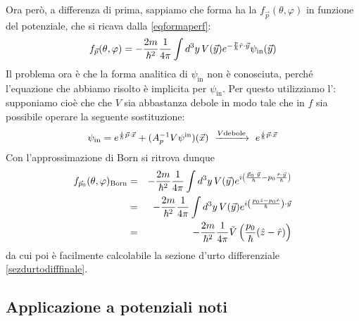 \documentclass[../../FisicaTeorica.tex]{subfiles}
\begin{document}
Ora per{\`o}, a differenza di prima, sappiamo che forma ha la $f_{\vec p}
(\theta, \varphi)$ in funzione del potenziale, che si ricava dalla \eqref{eqformaperf}:
\[ f_{\vec p} (\theta, \varphi) = - \frac{2 m}{\hbar^2}  \frac{1}{4 \pi}  \int
   d^3 y \hspace{0.17em} V (\vec{y}) e^{- \frac{p}{\hbar}  \hat{r} \cdot
   \vec{y}} \psi_{\text{in}} (\vec{y}) \]
Il problema ora {\`e} che la forma analitica di  $\psi_{\text{in}}$ non {\`e} conosciuta, perché l'equazione che abbiamo risolto è implicita per $\psi_\text{in}$. Per questo utilizziamo l'{}:
supponiamo cio{\`e} che che $V$ sia abbastanza debole in modo tale che in $f$
sia possibile operare la seguente sostituzione:
\[ \psi_{\text{in}} = e^{\frac{i}{\hbar}  \vec{p} \cdot \vec{x}} + (A_p^{- 1}
   V \psi^{\text{in}}) (\vec{x}) \hspace{0.17em} \hspace{0.17em}
   \xrightarrow{V \text{debole}} \hspace{0.17em} \hspace{0.17em}
   e^{\frac{i}{\hbar}  \vec{p} \cdot \vec{x}} \]
Con l'approssimazione di Born si ritrova dunque
\begin{eqnarray*}
  f_{\vec p_0} (\theta, \varphi)_{\text{Born}} & = & - \frac{2 m}{\hbar^2}  \frac{1}{4
  \pi}  \int d^3 y \hspace{0.17em} V (\vec{y}) e^{i \left( \frac{\vec{p}_0
  \cdot \vec{y}}{\hbar} - p_0  \frac{\hat{r} \cdot \vec{y}}{\hbar} \right)}\\
  & = & - \frac{2 m}{\hbar^2}  \frac{1}{4 \pi}  \int d^3 y \hspace{0.17em} V
  (\vec{y}) e^{i \left( \frac{p_0  \hat{z} - p_0  \hat{r}}{\hbar} \right)
  \cdot \vec{y}}\\
  & = & - \frac{2 m}{\hbar^2}  \frac{1}{4 \pi}  \tilde{V} \left(
  \frac{p_0}{\hbar} (\hat{z} - \hat{r}) \right)
\end{eqnarray*}
da cui poi è facilmente calcolabile la sezione d'urto differenziale \eqref{sezdurtodifffinale}.

\subsection{Applicazione a potenziali noti}
\end{document}
